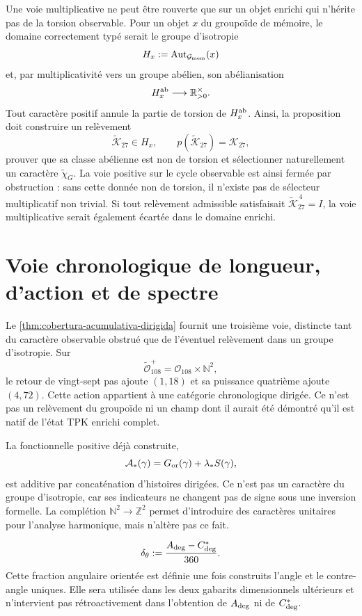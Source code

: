Une voie multiplicative ne peut être rouverte que sur un objet enrichi qui
n'hérite pas de la torsion observable. Pour un objet \(x\) du groupoïde de mémoire,
le domaine correctement typé serait le groupe d'isotropie
\[
 H_x:=\operatorname{Aut}_{\mathcal G_{\rm mem}}(x)
\]
et, par multiplicativité vers un groupe abélien, son abélianisation
\[
 H_x^{\rm ab}\longrightarrow\mathbb R_{>0}^{\times}.
\]
Tout caractère positif annule la partie de torsion de \(H_x^{\rm ab}\). Ainsi,
la proposition doit construire un relèvement
\[
 \widetilde{\mathcal K}_{27}\in H_x,
 \qquad
 p(\widetilde{\mathcal K}_{27})=\mathcal K_{27},
\]
prouver que sa classe abélienne est non de torsion et sélectionner naturellement
un caractère \(\widetilde\chi_G\). La voie positive sur le cycle observable
est ainsi fermée par obstruction : sans cette donnée non de torsion, il n'existe pas de
sélecteur multiplicatif non trivial. Si tout relèvement admissible
satisfaisait
\(\widetilde{\mathcal K}_{27}^{\,4}=I\), la voie multiplicative serait
également écartée dans le domaine enrichi.

\section{Voie chronologique de longueur, d'action et de spectre}
\label{sec:via-cronologica-espectral-G}

Le \cref{thm:cobertura-acumulativa-dirigida} fournit une troisième voie,
distincte tant du caractère observable obstrué que de l'éventuel
relèvement dans un groupe d'isotropie. Sur
\[
 \widetilde{\mathcal O}_{108}^{+}
 =\mathcal O_{108}\times\mathbb N^2,
\]
le retour de vingt-sept pas ajoute \((1,18)\) et sa puissance quatrième ajoute
\((4,72)\). Cette action appartient à une catégorie chronologique dirigée. Ce n'est pas
un relèvement du groupoïde ni un champ dont il aurait été démontré qu'il est natif de
l'état TPK enrichi complet.

La fonctionnelle positive déjà construite,
\[
 \mathcal A_\ast(\gamma)
 =G_{\rm or}(\gamma)+\lambda_\ast S(\gamma),
\]
est additive par concaténation d'histoires dirigées. Ce n'est pas un caractère du
groupe d'isotropie, car ses indicateurs ne changent pas de signe sous une
inversion formelle. La complétion
\(\mathbb N^2\to\mathbb Z^2\) permet d'introduire des caractères unitaires pour
l'analyse harmonique, mais n'altère pas ce fait.

\begin{equation}
\label{eq:fraccion-angular-orientada-G}
 \delta_\theta
 :=\frac{A_{\rm deg}-C_{\rm deg}^{\ast}}{360}.
\end{equation}
Cette fraction angulaire orientée est définie une fois construits l'angle et le
contre-angle uniques. Elle sera utilisée dans les deux gabarits dimensionnels
ultérieurs et n'intervient pas rétroactivement dans l'obtention de
\(A_{\rm deg}\) ni de \(C_{\rm deg}^{\ast}\).

